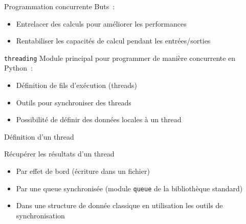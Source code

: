 \begin{frame}{Programmation concurrente}
  Buts~:
  \begin{itemize}[<+->]
    \item Entrelacer des calculs pour améliorer les performances
    \item Rentabiliser les capacités de calcul pendant les entrées/sorties
  \end{itemize}
\end{frame}

\begin{frame}{\texttt{threading}}
  Module principal pour programmer de manière concurrente en Python~:

  \begin{itemize}[<+->]
    \item Définition de fils d'exécution (threads)
    \item Outils pour synchroniser des threads
    \item Possibilité de définir des données locales à un thread
  \end{itemize}


\end{frame}

\begin{frame}{Définition d'un thread}
\end{frame}

\begin{frame}{Récupérer les résultats d'un thread}
  \begin{itemize}[<+->]
    \item Par effet de bord (écriture dans un fichier)
    \item Par une queue synchronisée (module \texttt{queue} de la bibliothèque standard)
    \item Dans une structure de donnée classique en utilisation les outils de synchronisation
  \end{itemize}
\end{frame}

